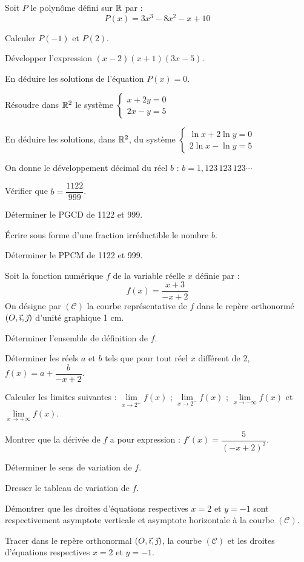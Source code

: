 \documentclass[11pt]{article}
\begin{document}

Soit $P$ le polynôme défini sur $\mathbb{R}$ par :
\[ P(x) = 3x^3 - 8x^2 - x + 10 \]
\begin{questions}
  \item Calculer $P(-1)$ et $P(2)$.
  \item Développer l'expression $(x - 2)(x + 1)(3x - 5)$.
  \item En déduire les solutions de l'équation $P(x) = 0$.
  \item Résoudre dans $\mathbb{R}^2$ le système $\begin{cases} x + 2y = 0 \\ 2x - y = 5 \end{cases}$
  \item En déduire les solutions, dans $\mathbb{R}^2$, du système $\begin{cases} \ln x + 2\ln y = 0 \\ 2\ln x - \ln y = 5 \end{cases}$
  \item On donne le développement décimal du réel $b$ : $b = 1{,}123\,123\,123\cdots$
  \begin{sousq}
    \item Vérifier que $b = \dfrac{1122}{999}$.
    \item Déterminer le PGCD de 1122 et 999.
    \item Écrire sous forme d'une fraction irréductible le nombre $b$.
    \item Déterminer le PPCM de 1122 et 999.
  \end{sousq}
\end{questions}

Soit la fonction numérique $f$ de la variable réelle $x$ définie par :
\[ f(x) = \frac{x + 3}{-x + 2} \]
On désigne par $(\mathcal{C})$ la courbe représentative de $f$ dans le repère orthonormé $(O,\vec{\imath},\vec{\jmath})$ d'unité graphique 1 cm.
\begin{questions}
  \item Déterminer l'ensemble de définition de $f$.
  \item Déterminer les réels $a$ et $b$ tels que pour tout réel $x$ différent de 2, $f(x) = a + \dfrac{b}{-x + 2}$.
  \item Calculer les limites suivantes : $\lim\limits_{x\to 2^+} f(x)$ ; $\lim\limits_{x\to 2^-} f(x)$ ; $\lim\limits_{x\to-\infty} f(x)$ et $\lim\limits_{x\to+\infty} f(x)$.
  \item Montrer que la dérivée de $f$ a pour expression : $f'(x) = \dfrac{5}{(-x + 2)^2}$.
  \item Déterminer le sens de variation de $f$.
  \item Dresser le tableau de variation de $f$.
  \item Démontrer que les droites d'équations respectives $x = 2$ et $y = -1$ sont respectivement asymptote verticale et asymptote horizontale à la courbe $(\mathcal{C})$.
  \item Tracer dans le repère orthonormal $(O,\vec{\imath},\vec{\jmath})$, la courbe $(\mathcal{C})$ et les droites d'équations respectives $x = 2$ et $y = -1$.
\end{questions}
\end{document}
